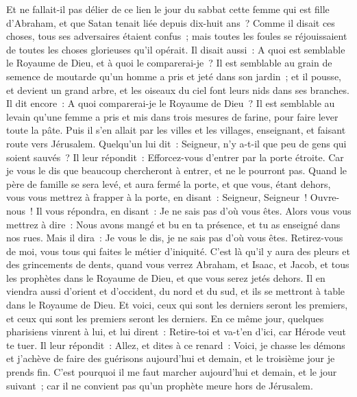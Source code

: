 \begin{multicols}{2}
Et ne fallait-il pas délier de ce lien le jour du sabbat cette femme qui est fille d'Abraham, et que Satan tenait liée depuis dix-huit ans~?
Comme il disait ces choses, tous ses adversaires étaient confus~; mais toutes les foules se réjouissaient de toutes les choses glorieuses qu'il opérait.
Il disait aussi~: A quoi est semblable le Royaume de Dieu, et à quoi le comparerai-je~?
Il est semblable au grain de semence de moutarde qu'un homme a pris et jeté dans son jardin~; et il pousse, et devient un grand arbre, et les oiseaux du ciel font leurs nids dans ses branches.
Il dit encore~: A quoi comparerai-je le Royaume de Dieu~?
Il est semblable au levain qu'une femme a pris et mis dans trois mesures de farine, pour faire lever toute la pâte.
Puis il s'en allait par les villes et les villages, enseignant, et faisant route vers Jérusalem.
Quelqu'un lui dit~: Seigneur, n'y a-t-il que peu de gens qui soient sauvés~? Il leur répondit~:
Efforcez-vous d'entrer par la porte étroite. Car je vous le dis que beaucoup chercheront à entrer, et ne le pourront pas.
Quand le père de famille se sera levé, et aura fermé la porte, et que vous, étant dehors, vous vous mettrez à frapper à la porte, en disant~: Seigneur, Seigneur~! Ouvre-nous~! Il vous répondra, en disant~: Je ne sais pas d'où vous êtes.
Alors vous vous mettrez à dire~: Nous avons mangé et bu en ta présence, et tu as enseigné dans nos rues.
Mais il dira~: Je vous le dis, je ne sais pas d'où vous êtes. Retirez-vous de moi, vous tous qui faites le métier d'iniquité.
C'est là qu'il y aura des pleurs et des grincements de dents, quand vous verrez Abraham, et Isaac, et Jacob, et tous les prophètes dans le Royaume de Dieu, et que vous serez jetés dehors.
Il en viendra aussi d'orient et d'occident, du nord et du sud, et ils se mettront à table dans le Royaume de Dieu.
Et voici, ceux qui sont les derniers seront les premiers, et ceux qui sont les premiers seront les derniers.
En ce même jour, quelques pharisiens vinrent à lui, et lui dirent~: Retire-toi et va-t'en d'ici, car Hérode veut te tuer.
Il leur répondit~: Allez, et dites à ce renard~: Voici, je chasse les démons et j'achève de faire des guérisons aujourd'hui et demain, et le troisième jour je prends fin.
C'est pourquoi il me faut marcher aujourd'hui et demain, et le jour suivant~; car il ne convient pas qu'un prophète meure hors de Jérusalem.

\end{multicols}
